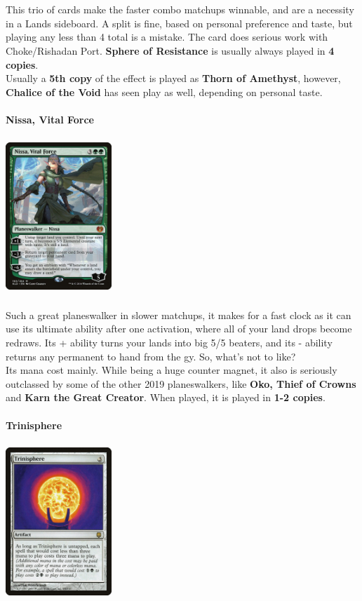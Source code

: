 \documentclass{report}
\begin{document}
\\\\This trio of cards make the faster combo matchups winnable, and are a necessity in a Lands sideboard. A split is fine, based on personal preference and taste, but playing any less than 4 total is a mistake. The card does serious work with Choke/Rishadan Port. \textbf{Sphere of Resistance} is usually always played in \textbf{4 copies}.\\Usually a \textbf{5th copy} of the effect is played as \textbf{Thorn of Amethyst}, however, \textbf{Chalice of the Void} has seen play as well, depending on personal taste.\\\\
\textbf{Nissa, Vital Force\\}
\begin{center}
\includegraphics [width = 4cm, height = 6cm] {nissa-vital-force}
\end{center}
Such a great planeswalker in slower matchups, it makes for a fast clock as it can use its ultimate ability after one activation, where all of your land drops become redraws. Its + ability turns your lands into big 5/5 beaters, and its - ability returns any permanent to hand from the gy. So, what's not to like?\\
Its mana cost mainly. While being a huge counter magnet, it also is seriously outclassed by some of the other 2019 planeswalkers, like \textbf{Oko, Thief of Crowns} and \textbf{Karn the Great Creator}. When played, it is played in \textbf{1-2 copies}.\\\\
\textbf{Trinisphere\\}
\begin{center}
\includegraphics [width = 4cm, height = 6cm] {trinisphere}
\end{center}
\end{document}
